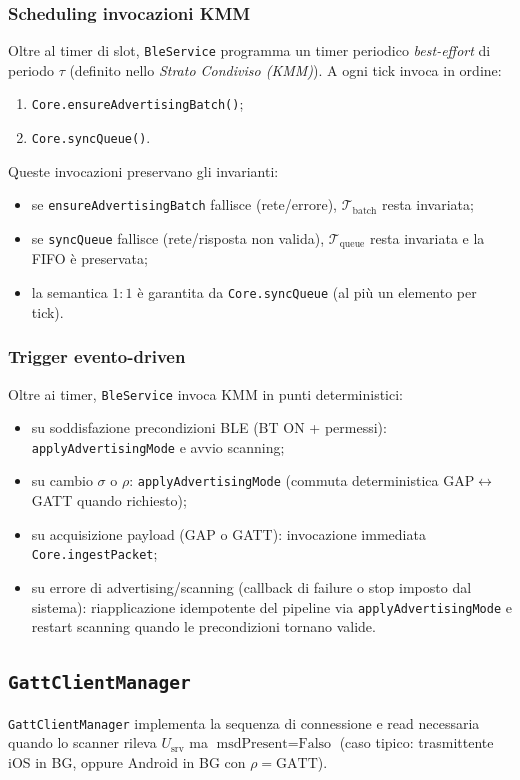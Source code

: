 \documentclass[a4paper,11pt,table,dvipsnames]{article}
\begin{document}
\subsubsection{Scheduling invocazioni KMM}
Oltre al timer di slot, \texttt{BleService} programma un timer periodico \emph{best-effort} di periodo \(\tau\) (definito nello \emph{Strato Condiviso (KMM)}). A ogni tick invoca in ordine:
\begin{enumerate}
    \item \texttt{Core.ensureAdvertisingBatch()};
    \item \texttt{Core.syncQueue()}.
\end{enumerate}
Queste invocazioni preservano gli invarianti:
\begin{itemize}[nosep]
    \item se \texttt{ensureAdvertisingBatch} fallisce (rete/errore), \(\mathcal{T}_{\text{batch}}\) resta invariata;
    \item se \texttt{syncQueue} fallisce (rete/risposta non valida), \(\mathcal{T}_{\text{queue}}\) resta invariata e la FIFO è preservata;
    \item la semantica \(1{:}1\) è garantita da \texttt{Core.syncQueue} (al più un elemento per tick).
\end{itemize}

\subsubsection{Trigger evento-driven}
Oltre ai timer, \texttt{BleService} invoca KMM in punti deterministici:
\begin{itemize}[nosep]
    \item su soddisfazione precondizioni BLE (BT ON + permessi): \texttt{applyAdvertisingMode} e avvio scanning;
    \item su cambio \(\sigma\) o \(\rho\): \texttt{applyAdvertisingMode} (commuta deterministica GAP\(\leftrightarrow\)GATT quando richiesto);
    \item su acquisizione payload (GAP o GATT): invocazione immediata \texttt{Core.ingestPacket};
    \item su errore di advertising/scanning (callback di failure o stop imposto dal sistema): riapplicazione idempotente del pipeline via \texttt{applyAdvertisingMode} e restart scanning quando le precondizioni tornano valide.
\end{itemize}

\subsection{\texttt{GattClientManager}}
\texttt{GattClientManager} implementa la sequenza di connessione e read necessaria quando lo scanner rileva \(U_{\text{srv}}\) ma \(\text{msdPresent}=\text{Falso}\) (caso tipico: trasmittente iOS in BG, oppure Android in BG con \(\rho=\mathrm{GATT}\)).
\end{document}
